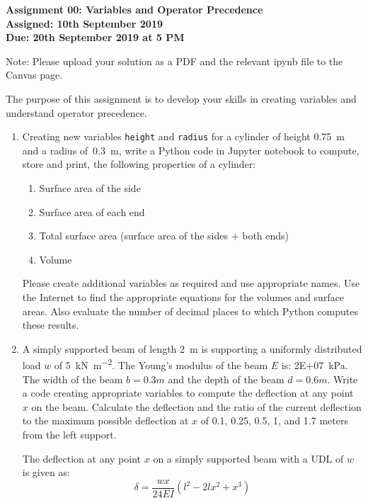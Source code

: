 \documentclass[a4paper,12pt]{article}
\begin{document}
\begin{centering}
	\textbf{
		Assignment 00: Variables and Operator Precedence\\
		Assigned: 10th September 2019\\
		Due: 20th September 2019 at 5 PM\\
	}
\end{centering}


Note: Please upload your solution as a PDF and the relevant ipynb file to the Canvas page.

\vspace{1em}
 
 The purpose of this assignment is to develop your skills in creating variables and understand operator precedence.
 
\begin{enumerate}
	\item Creating new variables \verb|height| and \verb|radius| for a cylinder of height \SI{0.75}{\meter} and a radius of~\SI{0.3}{\meter}, write a Python code in Jupyter notebook to compute, store and print, the following properties of a cylinder:
	\begin{enumerate}
		\item Surface area of the side
		\item Surface area of each end
		\item Total surface area (surface area of the sides + both ends)
		\item Volume
	\end{enumerate}
	Please create additional variables as required and use appropriate names. Use the Internet to find the appropriate equations for the volumes and surface areas. Also evaluate the number of decimal places to which Python computes these results.
	
	\item A simply supported beam of length \SI{2}{\meter} is supporting a uniformly distributed load $w$ of \SI{5}{\kilo \newton \per \meter \squared}. The Young's modulus of the beam $E$ is: \SI{2E+07}{\kilo\pascal}. The width of the beam $b = 0.3m$ and the depth of the beam $d = 0.6m$. Write a code creating appropriate variables to compute the deflection at any point $x$ on the beam. Calculate the deflection and the ratio of the current deflection to the maximum possible deflection at $x$ of 0.1, 0.25, 0.5, 1, and 1.7 meters from the left support.
	
	The deflection at any point $x$ on a simply supported beam with a UDL of $w$ is given as:
	\begin{equation*}
		\delta = \frac{w x}{24 EI}(l^2 - 2lx^2 + x^3)
	\end{equation*}
	

\end{enumerate}
\end{document}
